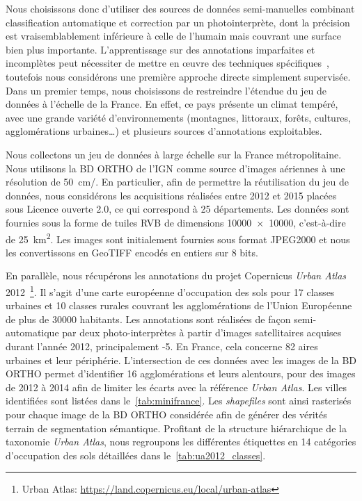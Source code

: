 Nous choisissons donc d'utiliser des sources de données semi-manuelles combinant classification automatique et correction par un photointerprète, dont la précision est vraisemblablement inférieure à celle de l'humain mais couvrant une surface bien plus importante. L'apprentissage sur des annotations imparfaites et incomplètes peut nécessiter de mettre en \oe{}uvre des techniques spécifiques~\cite{lu_learning_2017}, toutefois nous considérons une première approche directe simplement supervisée. Dans un premier temps, nous choisissons de restreindre l'étendue du jeu de données à l'échelle de la France. En effet, ce pays présente un climat tempéré, avec une grande variété d'environnements (montagnes, littoraux, forêts, cultures, agglomérations urbaines\dots) et plusieurs sources d'annotations exploitables.

Nous collectons un jeu de données à large échelle sur la France métropolitaine. Nous utilisons la BD ORTHO de l'\gls{IGN} comme source d'images aériennes à une résolution de \SI{50}{\centi\meter/\px}. En particulier, afin de permettre la réutilisation du jeu de données, nous considérons les acquisitions réalisées entre 2012 et 2015 placées sous Licence ouverte 2.0, ce qui correspond à 25 départements. Les données sont fournies sous la forme de tuiles \gls{RVB} de dimensions \SI{10000x10000}{\px}, c'est-à-dire de \SI{25}{\kilo\meter\squared}. Les images sont initialement fournies sous format JPEG2000 et nous les convertissons en GeoTIFF encodés en entiers sur 8 bits.

En parallèle, nous récupérons les annotations du projet Copernicus \emph{Urban Atlas} 2012~\footnote{Urban Atlas: \url{https://land.copernicus.eu/local/urban-atlas}}. Il s'agit d'une carte européenne d'occupation des sols pour 17 classes urbaines et 10 classes rurales couvrant les agglomérations de l'Union Européenne de plus de \num{30000} habitants. Les annotations sont réalisées de façon semi-automatique par deux photo-interprètes à partir d'images satellitaires acquises durant l'année 2012, principalement -5. En France, cela concerne 82 aires urbaines et leur périphérie. L'intersection de ces données avec les images de la BD ORTHO permet d'identifier 16 agglomérations et leurs alentours, pour des images de 2012 à 2014 afin de limiter les écarts avec la référence \emph{Urban Atlas}. Les villes identifiées sont listées dans le~\cref{tab:minifrance}. Les \emph{shapefiles} sont ainsi rasterisés pour chaque image de la BD ORTHO considérée afin de générer des vérités terrain de segmentation sémantique. Profitant de la structure hiérarchique de la taxonomie \emph{Urban Atlas}, nous regroupons les différentes étiquettes en 14 catégories d'occupation des sols détaillées dans le~\cref{tab:ua2012_classes}.

